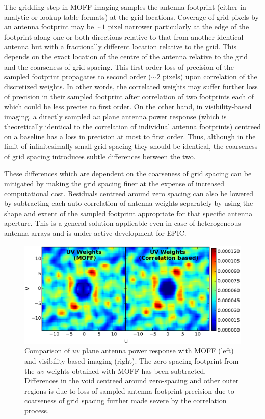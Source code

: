 \documentclass[a4paper,fleqn,usenatbib]{mnras}
\begin{document}
The gridding step in MOFF imaging samples the antenna footprint (either in 
analytic or lookup table formats) at the grid locations. Coverage of grid pixels 
by an antenna footprint may be $\sim 1$ pixel narrower particularly at the 
edge of the footprint along one or both directions relative to that from another 
identical antenna but with a fractionally different location relative to the 
grid. This depends on the exact location of the centre of the antenna relative 
to the grid and the coarseness of grid spacing. This first order loss of 
precision of the sampled footprint propagates to second order ($\sim 2$ pixels) 
upon correlation of the discretized weights. In other words, the correlated 
weights may suffer further loss of precision in their sampled footprint after 
correlation of two footprints each of which could be less precise to first 
order. On the other hand, in visibility-based imaging, a directly sampled $uv$ 
plane antenna power response (which is theoretically identical to the correlation 
of individual antenna footprints) centreed on a baseline has a loss in precision 
at most to first order. Thus, although in the limit of infinitesimally small 
grid spacing they should be identical, the coarseness of grid spacing introduces 
subtle differences between the two.

These differences which are dependent on the coarseness of grid spacing can be 
mitigated by making the grid spacing finer at the expense of increased 
computational cost. Residuals centreed around zero spacing can also be lowered 
by subtracting each auto-correlation of antenna weights separately by using the 
shape and extent of the sampled footprint appropriate for that specific antenna 
aperture. This is a general solution applicable even in case of heterogeneous 
antenna arrays and is under active development for EPIC.

\begin{figure}
  \includegraphics[width=\columnwidth]{figure7}
  \caption{Comparison of $uv$ plane antenna power response with MOFF (left) and 
    visibility-based imaging (right). The zero-spacing footprint from the $uv$ 
    weights obtained with MOFF has been subtracted. Differences in the void 
    centreed around zero-spacing and other outer regions is due to loss of 
    sampled antenna footprint precision due to coarseness of grid spacing 
    further made severe by the correlation process.}
  \label{fig:MOFF-FX-uvwts}
\end{figure}
\end{document}
